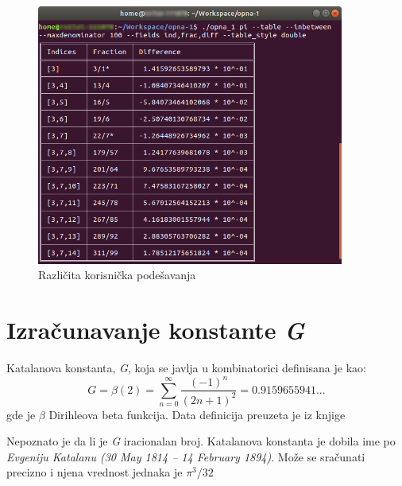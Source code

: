 \documentclass[a4paper,10pt]{article}
\begin{document}
\begin{figure}
\begin{center}
\includegraphics[width=0.9\textwidth]{pi_example2.png}
\caption{Različita korisnička podešavanja}
\label{fig:pi_example2}
\end{center}
\end{figure}

\newpage


\section{Izračunavanje konstante \textit{G}}

Katalanova konstanta, \textit{G}, koja se javlja u kombinatorici definisana je kao:
\begin{equation}
\mathit{G} = \beta(2) = \sum_{n=0}^{\infty}\frac{(-1)^n}{(2n+1)^2} = 0.9159655941...
\end{equation}
gde je $\beta$ Dirihleova beta funkcija. Data definicija preuzeta je iz knjige \cite{BOOK:Constants}

\vspace{11pt}

Nepoznato je da li je \textit{G} iracionalan broj. Katalanova konstanta je dobila ime po \textit{Evgeniju Katalanu (30 May 1814 – 14 February 1894)}. Može se sračunati precizno i njena vrednost jednaka je $\pi^3/32$ 
\end{document}
